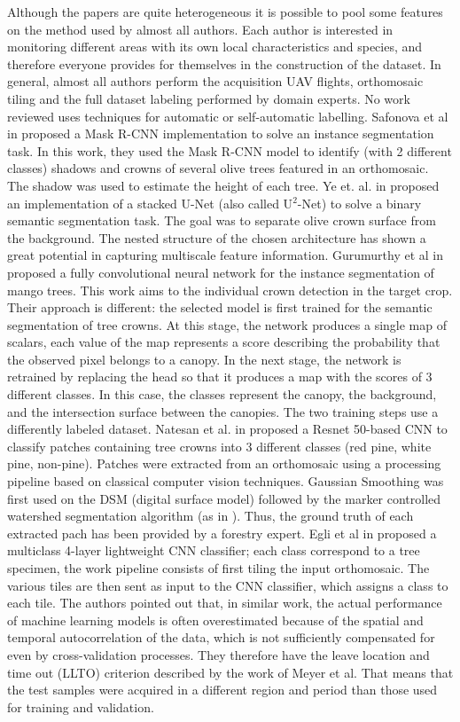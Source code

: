 \documentclass[comsoc,final]{IEEEtran}
\begin{document}
Although the papers are quite heterogeneous it is possible to pool some features
on the method used by almost all authors. Each author is interested
in monitoring different areas with its own local characteristics and species, and therefore everyone
provides for themselves in the construction of the dataset. In general, almost all authors perform the acquisition UAV flights, orthomosaic tiling and the full dataset labeling performed by domain experts.
No work reviewed uses techniques for automatic or self-automatic labelling.
Safonova et al in \cite{s21051617} proposed a Mask R-CNN implementation to solve an instance segmentation task.
In this work, they used the Mask R-CNN model to identify (with 2 different classes) shadows and crowns of several olive trees featured in an orthomosaic.
The shadow was used to estimate the height of each tree. 
Ye et. al. in \cite{rs14061523} proposed an implementation of a stacked U-Net (also called U$^2$-Net) to solve a binary semantic segmentation task. 
The goal was to separate olive crown surface from the background. 
The nested structure of the chosen architecture has shown a great potential in capturing multiscale feature information.
Gurumurthy et al in \cite{gurumurthy_mango_2019} proposed a fully convolutional neural network for the instance segmentation of mango trees. 
This work aims to the individual crown detection in the target crop. 
Their approach is different: the selected model is first trained for the semantic segmentation of tree crowns. 
At this stage, the network produces a single map of scalars, each value of the map represents a score describing the probability that the observed pixel belongs to a canopy. 
In the next stage, the network is retrained by replacing the head so that it produces a map with the scores of 3 different classes. 
In this case, the classes represent the canopy, the background, and the intersection surface between the canopies. 
The two training steps use a differently labeled dataset.
Natesan et al. in \cite{Natesan2019475} proposed a Resnet 50-based CNN to classify patches containing tree crowns into 3 different classes (red pine, white pine, non-pine). 
Patches were extracted from an orthomosaic using a processing pipeline based on classical computer vision techniques. Gaussian Smoothing was first used on the DSM (digital surface model) followed by the marker controlled watershed segmentation algorithm (as in \cite{Vepakomma2018}). Thus, the ground truth of each extracted pach has been provided by a forestry expert. Egli et al in \cite{Egli20201} proposed a multiclass 4-layer lightweight CNN classifier; each class correspond to a tree specimen, the work pipeline consists of first tiling the input orthomosaic. The various tiles are then sent as input to the CNN classifier, which assigns a class to each tile. 
The authors pointed out that, in similar work, the actual performance of machine learning models is often overestimated because of the spatial and temporal autocorrelation of the data, which is not sufficiently compensated for even by cross-validation processes. They therefore have the leave location and time out (LLTO) criterion described by the work of Meyer et al. 
That means that the test samples were acquired in a different region and period than those used for training and validation.
\end{document}
